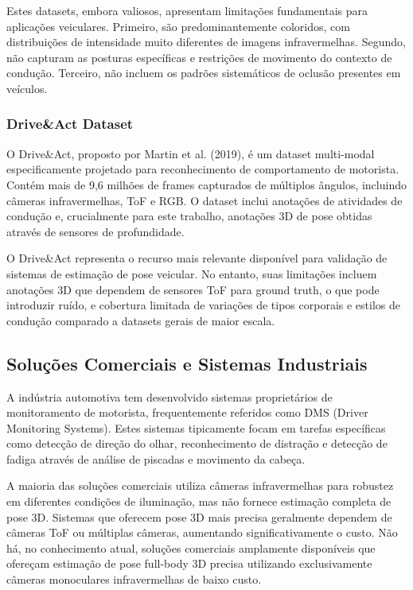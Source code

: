 \documentclass[12pt, a4paper]{article}
\begin{document}
Estes datasets, embora valiosos, apresentam limitações fundamentais para aplicações veiculares. Primeiro, são predominantemente coloridos, com distribuições de intensidade muito diferentes de imagens infravermelhas. Segundo, não capturam as posturas específicas e restrições de movimento do contexto de condução. Terceiro, não incluem os padrões sistemáticos de oclusão presentes em veículos.

\subsubsection{Drive\&Act Dataset}

O Drive\&Act, proposto por Martin et al. (2019), é um dataset multi-modal especificamente projetado para reconhecimento de comportamento de motorista. Contém mais de 9,6 milhões de frames capturados de múltiplos ângulos, incluindo câmeras infravermelhas, ToF e RGB. O dataset inclui anotações de atividades de condução e, crucialmente para este trabalho, anotações 3D de pose obtidas através de sensores de profundidade.

O Drive\&Act representa o recurso mais relevante disponível para validação de sistemas de estimação de pose veicular. No entanto, suas limitações incluem anotações 3D que dependem de sensores ToF para ground truth, o que pode introduzir ruído, e cobertura limitada de variações de tipos corporais e estilos de condução comparado a datasets gerais de maior escala.

\subsection{Soluções Comerciais e Sistemas Industriais}

A indústria automotiva tem desenvolvido sistemas proprietários de monitoramento de motorista, frequentemente referidos como DMS (Driver Monitoring Systems). Estes sistemas tipicamente focam em tarefas específicas como detecção de direção do olhar, reconhecimento de distração e detecção de fadiga através de análise de piscadas e movimento da cabeça.

A maioria das soluções comerciais utiliza câmeras infravermelhas para robustez em diferentes condições de iluminação, mas não fornece estimação completa de pose 3D. Sistemas que oferecem pose 3D mais precisa geralmente dependem de câmeras ToF ou múltiplas câmeras, aumentando significativamente o custo. Não há, no conhecimento atual, soluções comerciais amplamente disponíveis que ofereçam estimação de pose full-body 3D precisa utilizando exclusivamente câmeras monoculares infravermelhas de baixo custo.
\end{document}
